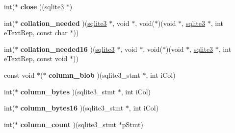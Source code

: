 \begin{DoxyCompactItemize}
\item 
int($\ast$ {\bfseries close} )(\hyperlink{structsqlite3}{sqlite3} $\ast$)\hypertarget{structsqlite3__api__routines_a26f93f921a5f6709be46902616ca8bcf}{}\label{structsqlite3__api__routines_a26f93f921a5f6709be46902616ca8bcf}

\item 
int($\ast$ {\bfseries collation\+\_\+needed} )(\hyperlink{structsqlite3}{sqlite3} $\ast$, void $\ast$, void($\ast$)(void $\ast$, \hyperlink{structsqlite3}{sqlite3} $\ast$,                                                                                                   int e\+Text\+Rep, const char $\ast$))\hypertarget{structsqlite3__api__routines_ae5855a53adb6c3d5967478bae7309adc}{}\label{structsqlite3__api__routines_ae5855a53adb6c3d5967478bae7309adc}

\item 
int($\ast$ {\bfseries collation\+\_\+needed16} )(\hyperlink{structsqlite3}{sqlite3} $\ast$, void $\ast$, void($\ast$)(void $\ast$, \hyperlink{structsqlite3}{sqlite3} $\ast$,                                                                                                           int e\+Text\+Rep, const void $\ast$))\hypertarget{structsqlite3__api__routines_af3599529e8d1e90ef41bfeb6b7044558}{}\label{structsqlite3__api__routines_af3599529e8d1e90ef41bfeb6b7044558}

\item 
const void $\ast$($\ast$ {\bfseries column\+\_\+blob} )(sqlite3\+\_\+stmt $\ast$, int i\+Col)\hypertarget{structsqlite3__api__routines_a66f2cefdf5bef54891cbef548f91c781}{}\label{structsqlite3__api__routines_a66f2cefdf5bef54891cbef548f91c781}

\item 
int($\ast$ {\bfseries column\+\_\+bytes} )(sqlite3\+\_\+stmt $\ast$, int i\+Col)\hypertarget{structsqlite3__api__routines_a79150244afb5f778840bc9df72d55342}{}\label{structsqlite3__api__routines_a79150244afb5f778840bc9df72d55342}

\item 
int($\ast$ {\bfseries column\+\_\+bytes16} )(sqlite3\+\_\+stmt $\ast$, int i\+Col)\hypertarget{structsqlite3__api__routines_ac1daf0a08de4a33c8db27a29f13a26ad}{}\label{structsqlite3__api__routines_ac1daf0a08de4a33c8db27a29f13a26ad}

\item 
int($\ast$ {\bfseries column\+\_\+count} )(sqlite3\+\_\+stmt $\ast$p\+Stmt)\hypertarget{structsqlite3__api__routines_af750a4727dc59edb4ad2933e28bfa358}{}\label{structsqlite3__api__routines_af750a4727dc59edb4ad2933e28bfa358}


\end{DoxyCompactItemize}
